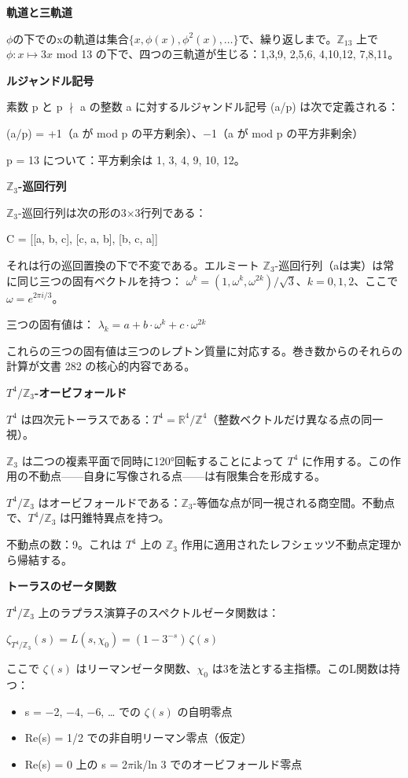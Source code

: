 \documentclass[11pt,openany]{book}
\begin{document}
\textbf{軌道と三軌道}

$\phi$の下でのxの軌道は集合$\{x,\phi(x),\phi^2(x),\ldots\}$で、繰り返しまで。$\mathbb{Z}_{13}$ 上で $\phi: x \mapsto 3x$ mod 13 の下で、四つの三軌道が生じる：{1,3,9}, {2,5,6}, {4,10,12}, {7,8,11}。

\textbf{ルジャンドル記号}

素数 p と p $\nmid$ a の整数 a に対するルジャンドル記号 (a/p) は次で定義される：

(a/p) = +1（a が mod p の平方剰余）、$-$1（a が mod p の平方非剰余）

p = 13 について：平方剰余は {1, 3, 4, 9, 10, 12}。

\textbf{$\mathbb{Z}_3$-巡回行列}

$\mathbb{Z}_3$-巡回行列は次の形の3×3行列である：

C = [[a, b, c], [c, a, b], [b, c, a]]

それは行の巡回置換の下で不変である。エルミート $\mathbb{Z}_3$-巡回行列（aは実）は常に同じ三つの固有ベクトルを持つ：
$\omega^k = (1,\omega^k,\omega^{2k})/\sqrt{3}$、$k = 0, 1, 2$、ここで $\omega = e^{2\pi i/3}$。

三つの固有値は：
$\lambda_k = a + b\cdot\omega^k + c\cdot\omega^{2k}$

これらの三つの固有値は三つのレプトン質量に対応する。巻き数からのそれらの計算が文書 282 の核心的内容である。

\textbf{$T^4/\mathbb{Z}_3$-オービフォールド}

$T^4$ は四次元トーラスである：$T^4 = \mathbb{R}^4/\mathbb{Z}^4$（整数ベクトルだけ異なる点の同一視）。

$\mathbb{Z}_3$ は二つの複素平面で同時に120°回転することによって $T^4$ に作用する。この作用の不動点——自身に写像される点——は有限集合を形成する。

$T^4/\mathbb{Z}_3$ はオービフォールドである：$\mathbb{Z}_3$-等価な点が同一視される商空間。不動点で、$T^4/\mathbb{Z}_3$ は円錐特異点を持つ。

不動点の数：9。これは $T^4$ 上の $\mathbb{Z}_3$ 作用に適用されたレフシェッツ不動点定理から帰結する。

\textbf{トーラスのゼータ関数}

$T^4/\mathbb{Z}_3$ 上のラプラス演算子のスペクトルゼータ関数は：

$\zeta_{T^4/\mathbb{Z}_3}(s) = L(s,\chi_0) = (1-3^{-s})\,\zeta(s)$

ここで $\zeta(s)$ はリーマンゼータ関数、$\chi_0$ は3を法とする主指標。このL関数は持つ：
\begin{itemize}
\item s = $-$2, $-$4, $-$6, … での $\zeta(s)$ の自明零点
\item Re(s) = 1/2 での非自明リーマン零点（仮定）
\item Re(s) = 0 上の s = 2$\pi$ik/ln 3 でのオービフォールド零点
\end{itemize}
\end{document}
